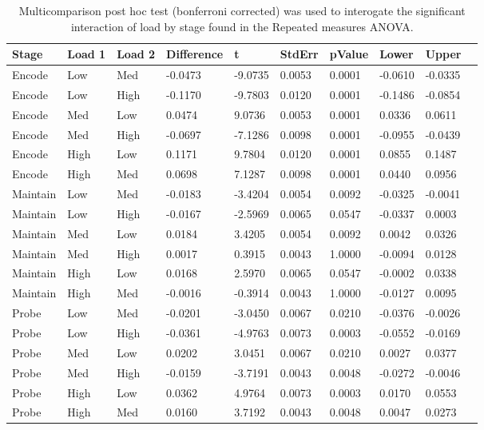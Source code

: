 \begin{table}
\centering
\begin{tabular}[0.2em]{@{}llllllllll@{}}\toprule
Stage & Load 1 & Load 2 & Difference & t & StdErr & pValue & Lower & Upper\\\toprule[0.2em]
Encode & Low & Med & -0.0473 & -9.0735 & 0.0053 & 0.0001 & -0.0610 & -0.0335 \\\midrule
Encode & Low & High & -0.1170 & -9.7803 & 0.0120 & 0.0001 & -0.1486 & -0.0854 \\\midrule
Encode & Med & Low & 0.0474 & 9.0736 & 0.0053 & 0.0001 & 0.0336 & 0.0611 \\\midrule
Encode & Med & High & -0.0697 & -7.1286 & 0.0098 & 0.0001 & -0.0955 & -0.0439 \\\midrule
Encode & High & Low & 0.1171 & 9.7804 & 0.0120 & 0.0001 & 0.0855 & 0.1487 \\\midrule
Encode & High & Med & 0.0698 & 7.1287 & 0.0098 & 0.0001 & 0.0440 & 0.0956 \\\midrule
Maintain & Low & Med & -0.0183 & -3.4204 & 0.0054 & 0.0092 & -0.0325 & -0.0041 \\\midrule
Maintain & Low & High & -0.0167 & -2.5969 & 0.0065 & 0.0547 & -0.0337 & 0.0003 \\\midrule
Maintain & Med & Low & 0.0184 & 3.4205 & 0.0054 & 0.0092 & 0.0042 & 0.0326 \\\midrule
Maintain & Med & High & 0.0017 & 0.3915 & 0.0043 & 1.0000 & -0.0094 & 0.0128 \\\midrule
Maintain & High & Low & 0.0168 & 2.5970 & 0.0065 & 0.0547 & -0.0002 & 0.0338 \\\midrule
Maintain & High & Med & -0.0016 & -0.3914 & 0.0043 & 1.0000 & -0.0127 & 0.0095 \\\midrule
Probe & Low & Med & -0.0201 & -3.0450 & 0.0067 & 0.0210 & -0.0376 & -0.0026 \\\midrule
Probe & Low & High & -0.0361 & -4.9763 & 0.0073 & 0.0003 & -0.0552 & -0.0169 \\\midrule
Probe & Med & Low & 0.0202 & 3.0451 & 0.0067 & 0.0210 & 0.0027 & 0.0377 \\\midrule
Probe & Med & High & -0.0159 & -3.7191 & 0.0043 & 0.0048 & -0.0272 & -0.0046 \\\midrule
Probe & High & Low & 0.0362 & 4.9764 & 0.0073 & 0.0003 & 0.0170 & 0.0553 \\\midrule
Probe & High & Med & 0.0160 & 3.7192 & 0.0043 & 0.0048 & 0.0047 & 0.0273 \\\bottomrule[0.2em]
\end{tabular}
\caption{Multicomparison post hoc test (bonferroni corrected) was used to interogate the significant interaction of load by stage found in the Repeated measures ANOVA.\label{tabel:tbl_RMAEFC1_PH_inter}}
\end{table}
